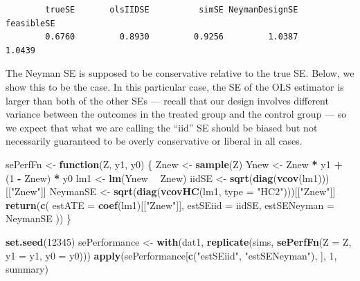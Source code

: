 \documentclass[
  12pt,
]{book}
\newenvironment{Shaded}{\begin{snugshade}}{\end{snugshade}}
\newcommand{\ControlFlowTok}[1]{\textcolor[rgb]{0.13,0.29,0.53}{\textbf{#1}}}
\newcommand{\DataTypeTok}[1]{\textcolor[rgb]{0.13,0.29,0.53}{#1}}
\newcommand{\DecValTok}[1]{\textcolor[rgb]{0.00,0.00,0.81}{#1}}
\newcommand{\KeywordTok}[1]{\textcolor[rgb]{0.13,0.29,0.53}{\textbf{#1}}}
\newcommand{\NormalTok}[1]{#1}
\newcommand{\OperatorTok}[1]{\textcolor[rgb]{0.81,0.36,0.00}{\textbf{#1}}}
\newcommand{\StringTok}[1]{\textcolor[rgb]{0.31,0.60,0.02}{#1}}
\theoremstyle{definition}
\theoremstyle{definition}
\theoremstyle{definition}
\theoremstyle{remark}
\begin{document}
\begin{verbatim}
        trueSE       olsIIDSE          simSE NeymanDesignSE     feasibleSE 
        0.6760         0.8930         0.9256         1.0387         1.0439 
\end{verbatim}

The Neyman SE is supposed to be conservative relative to the true SE.
Below, we show this to be the case. In this particular case, the SE of
the OLS estimator is larger than both of the other SEs --- recall that
our design involves different variance between the outcomes in the
treated group and the control group --- so we expect that what we are
calling the ``iid'' SE should be biased but not necessarily guaranteed
to be overly conservative or liberal in all cases.

\begin{Shaded}
\begin{Highlighting}[]
\NormalTok{sePerfFn <-}\StringTok{ }\ControlFlowTok{function}\NormalTok{(Z, y1, y0) \{}
\NormalTok{  Znew <-}\StringTok{ }\KeywordTok{sample}\NormalTok{(Z)}
\NormalTok{  Ynew <-}\StringTok{ }\NormalTok{Znew }\OperatorTok{*}\StringTok{ }\NormalTok{y1 }\OperatorTok{+}\StringTok{ }\NormalTok{(}\DecValTok{1} \OperatorTok{-}\StringTok{ }\NormalTok{Znew) }\OperatorTok{*}\StringTok{ }\NormalTok{y0}
\NormalTok{  lm1 <-}\StringTok{ }\KeywordTok{lm}\NormalTok{(Ynew }\OperatorTok{~}\StringTok{ }\NormalTok{Znew)}
\NormalTok{  iidSE <-}\StringTok{ }\KeywordTok{sqrt}\NormalTok{(}\KeywordTok{diag}\NormalTok{(}\KeywordTok{vcov}\NormalTok{(lm1)))[[}\StringTok{"Znew"}\NormalTok{]]}
\NormalTok{  NeymanSE <-}\StringTok{ }\KeywordTok{sqrt}\NormalTok{(}\KeywordTok{diag}\NormalTok{(}\KeywordTok{vcovHC}\NormalTok{(lm1, }\DataTypeTok{type =} \StringTok{"HC2"}\NormalTok{)))[[}\StringTok{"Znew"}\NormalTok{]]}
  \KeywordTok{return}\NormalTok{(}\KeywordTok{c}\NormalTok{(}
    \DataTypeTok{estATE =} \KeywordTok{coef}\NormalTok{(lm1)[[}\StringTok{"Znew"}\NormalTok{]],}
    \DataTypeTok{estSEiid =}\NormalTok{ iidSE,}
    \DataTypeTok{estSENeyman =}\NormalTok{ NeymanSE}
\NormalTok{  ))}
\NormalTok{\}}
\end{Highlighting}
\end{Shaded}

\begin{Shaded}
\begin{Highlighting}[]
\KeywordTok{set.seed}\NormalTok{(}\DecValTok{12345}\NormalTok{)}
\NormalTok{sePerformance <-}\StringTok{ }\KeywordTok{with}\NormalTok{(dat1, }\KeywordTok{replicate}\NormalTok{(sims, }\KeywordTok{sePerfFn}\NormalTok{(}\DataTypeTok{Z =}\NormalTok{ Z, }\DataTypeTok{y1 =}\NormalTok{ y1, }\DataTypeTok{y0 =}\NormalTok{ y0)))}
\KeywordTok{apply}\NormalTok{(sePerformance[}\KeywordTok{c}\NormalTok{(}\StringTok{"estSEiid"}\NormalTok{, }\StringTok{"estSENeyman"}\NormalTok{), ], }\DecValTok{1}\NormalTok{, summary)}
\end{Highlighting}
\end{Shaded}
\end{document}
